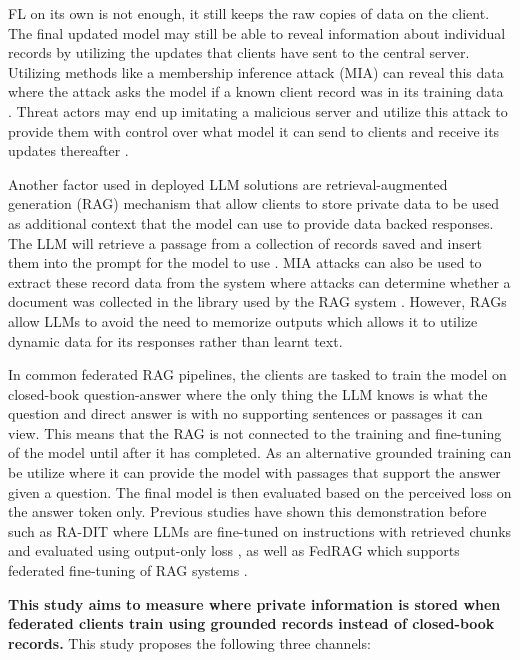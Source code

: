 \documentclass[11pt]{article}
\begin{document}
FL on its own is not enough, it still keeps the raw copies of data on the client. The final updated model may still be able to reveal information about individual records by utilizing the updates that clients have sent to the central server. Utilizing methods like a membership inference attack (MIA) can reveal this data where the attack asks the model if a known client record was in its training data \citep{yeom2018privacy}. Threat actors may end up imitating a malicious server and utilize this attack to provide them with control over what model it can send to clients and receive its updates thereafter \citep{nguyen2023active,nguyen2025theoretically}.

Another factor used in deployed LLM solutions are retrieval-augmented generation (RAG) mechanism that allow clients to store private data to be used as additional context that the model can use to provide data backed responses. The LLM will retrieve a passage from a collection of records saved and insert them into the prompt for the model to use \citep{lewis2020rag}. MIA attacks can also be used to extract these record data from the system where attacks can determine whether a document was collected in the library used by the RAG system \citep{anderson2024membership,naseh2025riddle,nguyen2026menta}. However, RAGs allow LLMs to avoid the need to memorize outputs which allows it to utilize dynamic data for its responses rather than learnt text.

In common federated RAG pipelines, the clients are tasked to train the model on closed-book question-answer where the only thing the LLM knows is what the question and direct answer is with no supporting sentences or passages it can view. This means that the RAG is not connected to the training and fine-tuning of the model until after it has completed. As an alternative grounded training can be utilize where it can provide the model with passages that support the answer given a question. The final model is then evaluated based on the perceived loss on the answer token only. Previous studies have shown this demonstration before such as RA-DIT where LLMs are fine-tuned on instructions with retrieved chunks and evaluated using output-only loss \citep{lin2024radit}, as well as FedRAG which supports federated fine-tuning of RAG systems \citep{fajardo2025fedrag}.

\textbf{This study aims to measure where private information is stored when federated clients train using grounded records instead of closed-book records.} This study proposes the following three channels:
\end{document}
